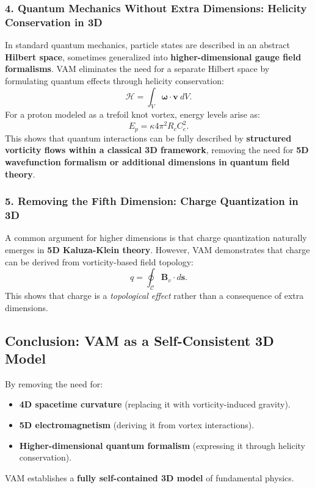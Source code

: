 \documentclass[a4paper,10pt]{article}
\begin{document}
\subsubsection{4. Quantum Mechanics Without Extra Dimensions: Helicity Conservation in 3D}
In standard quantum mechanics, particle states are described in an abstract \textbf{Hilbert space}, sometimes generalized into \textbf{higher-dimensional gauge field formalisms}. VAM eliminates the need for a separate Hilbert space by formulating quantum effects through helicity conservation:
\begin{equation*}
    \mathcal{H} = \int_V \mathbf{\omega} \cdot \mathbf{v} \ dV.
\end{equation*}
For a proton modeled as a trefoil knot vortex, energy levels arise as:
\begin{equation*}
    E_p = \kappa 4\pi^2 R_c C_e^2.
\end{equation*}
This shows that quantum interactions can be fully described by \textbf{structured vorticity flows within a classical 3D framework}, removing the need for \textbf{5D wavefunction formalism or additional dimensions in quantum field theory}.

\subsubsection{5. Removing the Fifth Dimension: Charge Quantization in 3D}
A common argument for higher dimensions is that charge quantization naturally emerges in \textbf{5D Kaluza-Klein theory}. However, VAM demonstrates that charge can be derived from vorticity-based field topology:
\begin{equation*}
    q = \oint_{\mathcal{C}} \mathbf{B}_v \cdot d\mathbf{s}.
\end{equation*}
This shows that charge is a \textit{topological effect} rather than a consequence of extra dimensions.

\subsection{Conclusion: VAM as a Self-Consistent 3D Model}
By removing the need for:
\begin{itemize}
    \item \textbf{4D spacetime curvature} (replacing it with vorticity-induced gravity).
    \item \textbf{5D electromagnetism} (deriving it from vortex interactions).
    \item \textbf{Higher-dimensional quantum formalism} (expressing it through helicity conservation).
\end{itemize}
VAM establishes a \textbf{fully self-contained 3D model} of fundamental physics.
\end{document}
